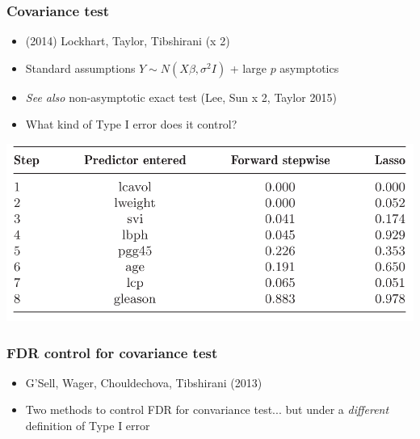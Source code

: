 \documentclass{beamer}
\begin{document}
\begin{frame}
\frametitle{Covariance test}
\begin{itemize}
\item (2014) Lockhart, Taylor, Tibshirani (x 2)
\item Standard assumptions $Y \sim N(X\beta, \sigma^2 I)$ + large $p$ asymptotics
\item \emph{See also} non-asymptotic exact test (Lee, Sun x 2, Taylor 2015)
\item What kind of Type I error does it control?
\end{itemize}
\begin{center}
\includegraphics[scale = 0.25]{covtest.png}
\end{center}
\end{frame}

\begin{frame}
\frametitle{FDR control for covariance test}
\begin{itemize}
\item G'Sell, Wager, Chouldechova, Tibshirani (2013)
\item Two methods to control FDR for convariance test... but under a \emph{different} definition of Type I error
\end{itemize}
\end{frame}
\end{document}
